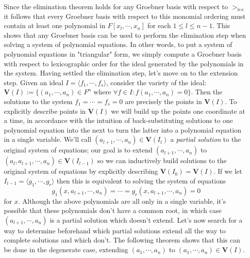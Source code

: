 \documentclass{article}
\begin{document}
\newline \newline
Since the elimination theorem holds for any Groebner basis with respect to $ >_{lex} $ it follows that every Groebner basis with respect to this monomial ordering must contain at least one polynomial in $ F[x_l, \cdots, x_n] $ for each $ 1 \leq l \leq n - 1 $. This shows that any Groebner basis can be used to perform the elimination step when solving a system of polynomial equations. In other words, to put a system of polynomial equations in "triangular" form, we simply compute a Groebner basis with respect to lexicographic order for the ideal generated by the polynomials in the system.
\newline \newline
Having settled the elimination step, let's move on to the extension step. Given an ideal $ I = \langle f_1, \cdots, f_s \rangle $, consider the variety of the ideal: $ \mathbf{V}(I) := \{ (a_1, \cdots, a_n) \in F^n \text{ where } \forall f \in I: f(a_1, \cdots, a_n) = 0 \} $. Then the solutions to the system $ f_1 = \cdots = f_s = 0 $ are precisely the points in $ \mathbf{V}(I) $. To explicitly describe points in $ \mathbf{V}(I) $ we will build up the points one coordinate at a time, in accordance with the intuition of back-substituting solutions to one polynomial equation into the next to turn the latter into a polynomial equation in a single variable. We'll call $ (a_{l + 1}, \cdots, a_n) \in \mathbf{V}(I_l) $ a \textit{partial solution} to the original system of equations; our goal is to extend $ (a_{l + 1}, \cdots, a_n) $ to $ (a_l, a_{l + 1}, \cdots, a_n) \in \mathbf{V}(I_{l - 1}) $ so we can inductively build solutions to the original system of equations by explicitly describing $ \mathbf{V}(I_0) = \mathbf{V}(I) $.
\newline
If we let $ I_{l - 1} = \langle g_1, \cdots, g_r \rangle $ then this is equivalent to solving the system of equations
$$ g_1(x, a_{l + 1}, \cdots, a_n) = \cdots = g_r(x, a_{l + 1}, \cdots, a_n) = 0 $$
for $ x $. Although the above polynomials are all only in a single variable, it's possible that these polynomials don't have a common root, in which case $ (a_{l + 1}, \cdots, a_n) $ is a partial solution which doesn't extend. Let's now search for a way to determine beforehand which partial solutions extend all the way to complete solutions and which don't. The following theorem shows that this can be done in the degenerate case, extending $ (a_1, \cdots, a_n) $ to $ (a_1, \cdots, a_n) \in \mathbf{V}(I) $.
\newline \newline
\end{document}
